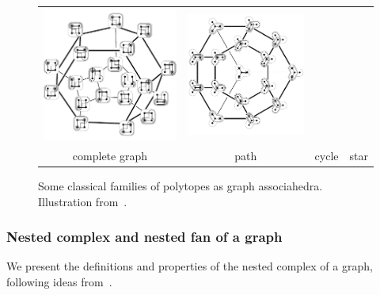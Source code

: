\documentclass{amsart}
\theoremstyle{definition}
\begin{document}
\begin{figure}[t]
{\begin{tabular}{c@{\;}c@{\;}c@{\;}c}
    		\includegraphics[scale=.6]{cyclohedronTubings} &
    		\includegraphics[scale=.6]{stellohedronTubings} \\[.1cm]
    		complete graph &
    		path &
    		cycle &
    		star
		\end{tabular}
	}
	\caption{Some classical families of polytopes as graph associahedra. Illustration from~\cite{MannevillePilaud-compatibilityFans}.}
	\label{fig:specialGraphAssociahedra}
\end{figure}

\subsubsection{Nested complex and nested fan of a graph}

We present the definitions and properties of the nested complex of a graph, following ideas from~\cite{CarrDevadoss, Postnikov, FeichtnerSturmfels, Zelevinsky}.
\end{document}
